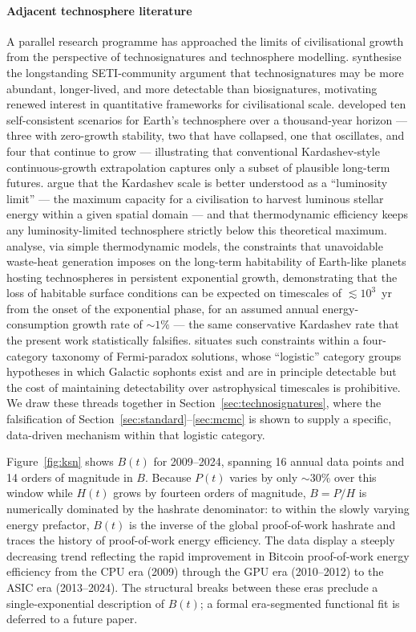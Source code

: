 \paragraph{Adjacent technosphere literature} A parallel research programme has
approached the limits of civilisational growth from the perspective of technosignatures
and technosphere modelling. \citet{Wright2022} synthesise the longstanding SETI-community
argument that technosignatures may be more abundant, longer-lived, and more detectable
than biosignatures, motivating renewed interest in quantitative frameworks for
civilisational scale. \citet{HaqqMisra2025a} developed ten self-consistent scenarios for
Earth's technosphere over a thousand-year horizon --- three with zero-growth stability,
two that have collapsed, one that oscillates, and four that continue to grow ---
illustrating that conventional Kardashev-style continuous-growth extrapolation captures
only a subset of plausible long-term futures. \citet{HaqqMisra2025b} argue that the
Kardashev scale is better understood as a ``luminosity limit'' --- the maximum capacity
for a civilisation to harvest luminous stellar energy within a given spatial domain ---
and that thermodynamic efficiency keeps any luminosity-limited technosphere strictly
below this theoretical maximum. \citet{BalbiLingam2025} analyse, via simple thermodynamic
models, the constraints that unavoidable waste-heat generation imposes on the long-term
habitability of Earth-like planets hosting technospheres in persistent exponential
growth, demonstrating that the loss of habitable surface conditions can be expected on
timescales of $\lesssim10^3$~yr from the onset of the exponential phase, for an assumed
annual energy-consumption growth rate of $\sim1\%$ --- the same conservative Kardashev
rate that the present work statistically falsifies. \citet{Cirkovic2018} situates such
constraints within a four-category taxonomy of Fermi-paradox solutions, whose
``logistic'' category groups hypotheses in which Galactic sophonts exist and are in
principle detectable but the cost of maintaining detectability over astrophysical
timescales is prohibitive. We draw these threads together in
Section~\ref{sec:technosignatures}, where the falsification of
Section~\ref{sec:standard}--\ref{sec:mcmc} is shown to supply a specific, data-driven
mechanism within that logistic category.

Figure~\ref{fig:ksn} shows $B(t)$ for 2009--2024, spanning 16 annual data points and 14
orders of magnitude in $B$. Because $P(t)$ varies by only $\sim30\%$ over this window while
$H(t)$ grows by fourteen orders of magnitude, $B=P/H$ is numerically dominated by the
hashrate denominator: to within the slowly varying energy prefactor, $B(t)$ is the inverse
of the global proof-of-work hashrate and traces the history of proof-of-work energy
efficiency. The data display a steeply decreasing trend reflecting the rapid improvement in
Bitcoin proof-of-work energy efficiency from the CPU era (2009) through the GPU era
(2010--2012) to the ASIC era (2013--2024). The structural breaks
between these eras preclude a single-exponential description of $B(t)$; a formal
era-segmented functional fit is deferred to a future paper.

